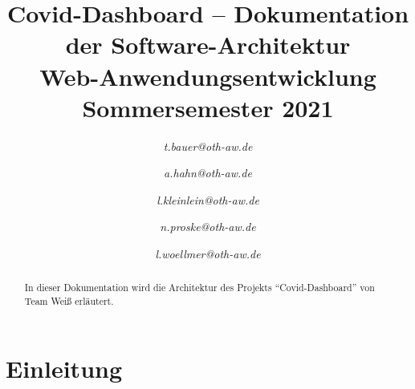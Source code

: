 \documentclass[conference]{IEEEtran}
\begin{document}
\title{Covid-Dashboard -- Dokumentation der Software-Architektur\\
{\footnotesize Web-Anwendungsentwicklung Sommersemester 2021}}
\author{
\textit{t.bauer@oth-aw.de}
\and
{}
\textit{a.hahn@oth-aw.de}
\and
{}
\textit{l.kleinlein@oth-aw.de}
\and
{}
\textit{n.proske@oth-aw.de}
\and
{}
\textit{l.woellmer@oth-aw.de}
}

\maketitle

\begin{abstract}
    In dieser Dokumentation wird die Architektur des Projekts "`Covid-Dashboard"' von Team Weiß erläutert.
\end{abstract}


\section{Einleitung}
\end{document}

